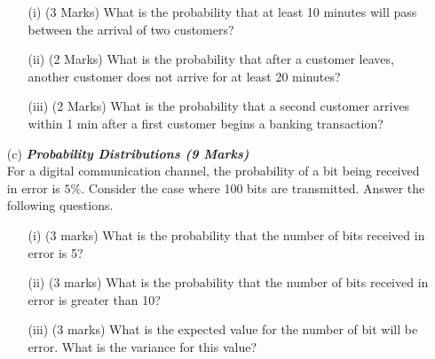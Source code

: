 \documentclass[]{article}
\begin{document}
\begin{itemize}
\begin{itemize}
\item[(i)] (3 Marks) What is the probability that at least 10 minutes will pass between the arrival of two customers?
\item[(ii)] (2 Marks) What is the probability that after a customer leaves, another customer does not arrive for at least 20 minutes?
\item[(iii)] (2 Marks) What is the probability that a second customer arrives within 1 min after a first customer begins a banking transaction?
\end{itemize}
\bigskip
\item[(c)] \textbf{\textit{Probability Distributions (9 Marks)}}\\
For a digital communication channel, the probability of a bit being received in error is $5\%$. Consider the case where 100 bits are transmitted. Answer the following questions.

\begin{itemize}
\item[(i)] (3 marks)	What is the probability that the number of bits received in error is 5?
\item[(ii)] (3 marks) What is the probability that the number of bits received in error is greater than 10?
\item[(iii)] (3 marks) What is the expected value for the number of bit will be error. What is the variance for this value?
\end{itemize}





\end{itemize}
\end{document}

